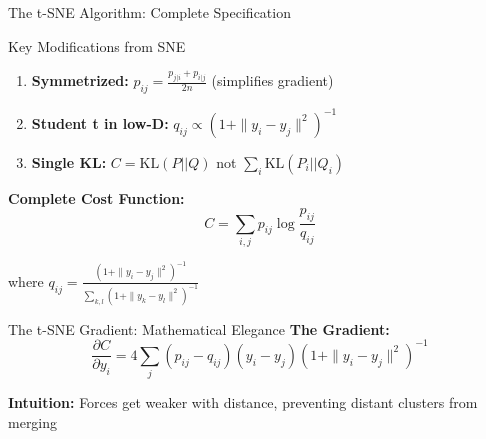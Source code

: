 \documentclass[aspectratio=169]{beamer}
\newcommand{\intuition}[1]{\colorbox{green!10}{\textcolor{intuitioncolor}{\textbf{Intuition:} #1}}}
\begin{document}
\begin{frame}{The t-SNE Algorithm: Complete Specification}
\begin{block}{Key Modifications from SNE}
\begin{enumerate}
\item \textbf{Symmetrized:} $p_{ij} = \frac{p_{j|i} + p_{i|j}}{2n}$ (simplifies gradient)
\item \textbf{Student t in low-D:} $q_{ij} \propto (1 + \|y_i - y_j\|^2)^{-1}$
  \item \textbf{Single KL:} $C = \text{KL}(P||Q)$ not $\sum_i \text{KL}(P_i||Q_i)$
    \end{enumerate}
  \end{block}
  
  \textbf{Complete Cost Function:}
  $$C = \sum_{i,j} p_{ij} \log\frac{p_{ij}}{q_{ij}}$$
    
    where $q_{ij} = \frac{(1 + \|y_i - y_j\|^2)^{-1}}{\sum_{k,l} (1 + \|y_k - y_l\|^2)^{-1}}$
      \end{frame}
    
    \begin{frame}{The t-SNE Gradient: Mathematical Elegance}
    \textbf{The Gradient:}
    $$\frac{\partial C}{\partial y_i} = 4\sum_j (p_{ij} - q_{ij})(y_i - y_j)(1 + \|y_i - y_j\|^2)^{-1}$$
      
      \begin{center}
    \end{center}
    
    \intuition{Forces get weaker with distance, preventing distant clusters from merging}
    \end{frame}
    
\end{document}
